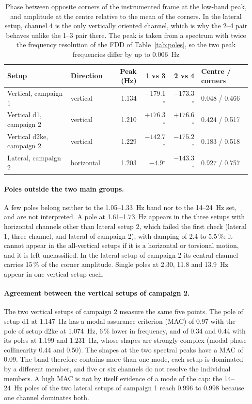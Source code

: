 \documentclass[11pt]{article}
\newcommand{\degr}{$^{\circ}$}
\begin{document}
\begin{table}[htbp]
\centering
\caption{Phase between opposite corners of the instrumented frame at the
low-band peak, and amplitude at the centre relative to the mean of the corners.
In the lateral setup, channel 4 is the only vertically oriented channel, which
is why the 2--4 pair behaves unlike the 1--3 pair there. The peak is taken from a spectrum with twice the frequency resolution of the FDD of Table~\ref{tab:poles}, so the two peak frequencies differ by up to 0.006~Hz}
\label{tab:phase}
\small
\begin{tabular}{@{}llrrrl@{}}
\toprule
Setup & Direction & Peak (Hz) & 1 vs 3 & 2 vs 4 & Centre / corners \\
\midrule
Vertical, campaign 1      & vertical   & 1.134 & $-179.1$\degr & $-173.3$\degr & 0.048 / 0.466 \\
Vertical d1, campaign 2   & vertical   & 1.210 & $+176.3$\degr & $+176.6$\degr & 0.424 / 0.517 \\
Vertical d2ke, campaign 2 & vertical   & 1.229 & $-142.7$\degr & $-175.2$\degr & 0.183 / 0.518 \\
Lateral, campaign 2       & horizontal & 1.203 & $-4.9$\degr   & $-143.3$\degr & 0.927 / 0.757 \\
\bottomrule
\end{tabular}
\end{table}

\paragraph{Poles outside the two main groups.} A few poles belong neither to
the 1.05--1.33~Hz band nor to the 14--24~Hz set, and are not interpreted. A
pole at 1.61--1.73~Hz appears in the three setups with horizontal channels
other than lateral setup 2, which failed the first check (lateral 1,
three-channel, and lateral of campaign 2), with damping of 2.4 to 5.5\,\%; it cannot appear in the all-vertical
setups if it is a horizontal or torsional motion, and it is left unclassified.
In the lateral setup of campaign 2 its central channel carries 15\,\% of the
corner amplitude. Single poles at 2.30, 11.8 and 13.9~Hz appear in one
vertical setup each.

\paragraph{Agreement between the vertical setups of campaign 2.} The two
vertical setups of campaign 2 measure the same five points. The pole of setup
d1 at 1.147~Hz has a modal assurance criterion (MAC) of 0.97 with the pole of
setup d2ke at 1.074~Hz, 6\,\% lower in frequency, and of 0.34 and 0.44 with
its poles at 1.199 and 1.231~Hz, whose shapes are strongly complex (modal
phase collinearity 0.44 and 0.50). The shapes at the two spectral peaks have a
MAC of 0.09. The band therefore contains more than one mode, each setup is
dominated by a different member, and five or six channels do not resolve the
individual members. A high MAC is not by itself evidence of a mode of the cap:
the 14--24~Hz poles of the two lateral setups of campaign 1 reach 0.996 to
0.998 because one channel dominates both.
\end{document}
